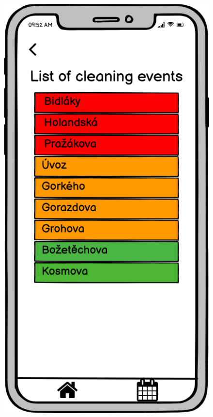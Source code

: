 \documentclass[10pt,xcolor=pdflatex,hyperref={unicode}]{beamer}
\begin{document}
\begin{frame}
\begin{figure}
\begin{minipage}{0.3\textwidth}
            \includegraphics[width=0.25\paperwidth]{img/wireframe3.png}
        \end{minipage}
    \end{figure}
\end{frame}
\end{document}
